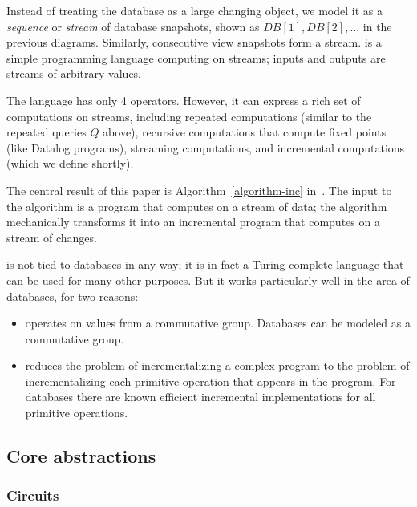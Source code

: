 Instead of treating the database as a large changing object, we model
it as a \emph{sequence} or \emph{stream} of database snapshots, shown
as $DB[1], DB[2], \ldots$ in the previous diagrams.  Similarly,
consecutive view snapshots form a stream.  \dbsp is a simple
programming language computing on streams; inputs and outputs are
streams of arbitrary values.

The \dbsp language has only 4 operators.  However, it can express a
rich set of computations on streams, including repeated computations
(similar to the repeated queries $Q$ above), recursive computations
that compute fixed points (like Datalog programs), streaming
computations, and incremental computations (which we define shortly).

The central result of this paper is Algorithm~\ref{algorithm-inc}
in~.  The input to the algorithm is a \dbsp
program that computes on a stream of data; the algorithm mechanically
transforms it into an incremental \dbsp program that computes on a
stream of changes.

\dbsp is not tied to databases in any way; it is in fact a
Turing-complete language that can be used for many other purposes.
But it works particularly well in the area of databases, for two
reasons:

\begin{itemize}[nosep, leftmargin=0pt, itemindent=0.5cm]
  \item \dbsp operates on values from a commutative group.  Databases
    can be modeled as a commutative group.
  \item \dbsp reduces the problem of incrementalizing a complex
    program to the problem of incrementalizing each primitive
    operation that appears in the program.  For databases there are
    known efficient incremental implementations for all primitive
    operations.
\end{itemize}

\subsection{Core abstractions}

\subsubsection{Circuits}

